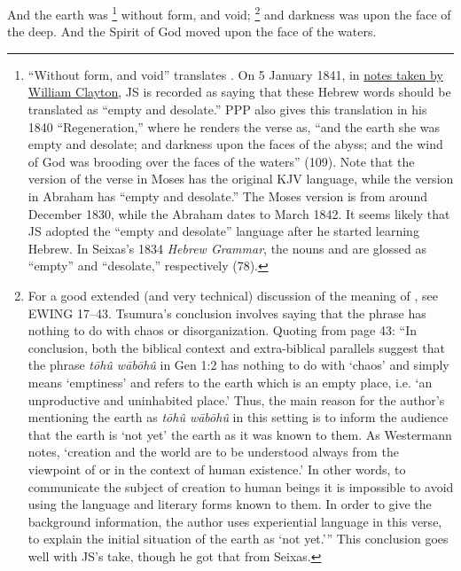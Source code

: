 			And the earth was
				\footnote{%
					``Without form, and void'' translates . On 5 January 1841, in \hyperlink{EMS-1841-JS-5-JAN-1841-WC-e}{notes taken by William Clayton}, JS is recorded as saying that these Hebrew words should be translated as ``empty and desolate.'' PPP also gives this translation in his 1840 ``Regeneration,'' where he renders the verse as, ``and the earth she was empty and desolate; and darkness upon the faces of the abyss; and the wind of God was brooding over the faces of the waters'' (109). Note that the version of the verse in Moses has the original KJV language, while the version in Abraham has ``empty and desolate.'' The Moses version is from around December 1830, while the Abraham dates to March 1842. It seems likely that JS adopted the ``empty and desolate'' language after he started learning Hebrew. In Seixas's 1834 \textit{Hebrew Grammar}, the nouns  and  are glossed as ``empty'' and ``desolate,'' respectively (78).
					}%
			without form, and void;%
				\footnote{%
					For a good extended (and very technical) discussion of the meaning of , see EWING 17--43. Tsumura's conclusion involves saying that the phrase has nothing to do with chaos or disorganization. Quoting from page 43: ``In conclusion, both the biblical context and extra-biblical parallels suggest that the phrase \textit{tōhû wābōhû} in Gen 1:2 has nothing to do with `chaos' and simply means `emptiness' and refers to the earth which is an empty place, i.e. `an unproductive and uninhabited place.' Thus, the main reason for the author's mentioning the earth as \textit{tōhû wābōhû} in this setting is to inform the audience that the earth is `not yet' the earth as it was known to them. As Westermann notes, `creation and the world are to be understood always from the viewpoint of or in the context of human existence.' In other words, to communicate the subject of creation to human beings it is impossible to avoid using the language and literary forms known to them. In order to give the background information, the author uses experiential language in this verse, to explain the initial situation of the earth as `not yet.''' This conclusion goes well with JS's take, though he got that from Seixas.
					}
			and darkness was upon the face of the deep. And the Spirit of God moved upon the face of the waters.

